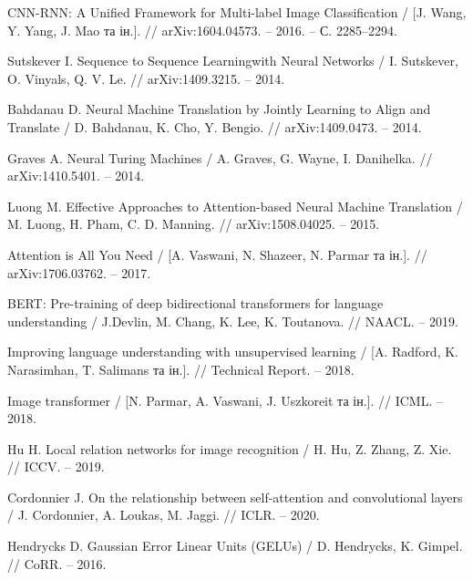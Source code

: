 \begin{thebibliography}{9}
    CNN-RNN: A Unified Framework for Multi-label Image Classification / [J. Wang, Y. Yang, J. Mao та ін.]. // arXiv:1604.04573. – 2016. – С. 2285–2294.

    Sutskever I. Sequence to Sequence Learningwith Neural Networks / I. Sutskever, O. Vinyals, Q. V. Le. // arXiv:1409.3215. – 2014.

    Bahdanau D. Neural Machine Translation by Jointly Learning to Align and Translate / D. Bahdanau, K. Cho, Y. Bengio. // arXiv:1409.0473. – 2014.

    Graves A. Neural Turing Machines / A. Graves, G. Wayne, I. Danihelka. // arXiv:1410.5401. – 2014.

    Luong M. Effective Approaches to Attention-based Neural Machine Translation / M. Luong, H. Pham, C. D. Manning. // arXiv:1508.04025. – 2015.

    Attention is All You Need / [A. Vaswani, N. Shazeer, N. Parmar та ін.]. // arXiv:1706.03762. – 2017.

    BERT: Pre-training of deep bidirectional transformers for language understanding / J.Devlin, M. Chang, K. Lee, K. Toutanova. // NAACL. – 2019.

    Improving language understanding with unsupervised learning / [A. Radford, K. Narasimhan, T. Salimans та ін.]. // Technical Report. – 2018.

    Image transformer / [N. Parmar, A. Vaswani, J. Uszkoreit та ін.]. // ICML. – 2018.

    Hu H. Local relation networks for image recognition / H. Hu, Z. Zhang, Z. Xie. // ICCV. – 2019.

    Cordonnier J. On the relationship between self-attention and convolutional layers / J. Cordonnier, A. Loukas, M. Jaggi. // ICLR. – 2020.

    Hendrycks D. Gaussian Error Linear Units (GELUs) / D. Hendrycks, K. Gimpel. // CoRR. – 2016.

\end{thebibliography}